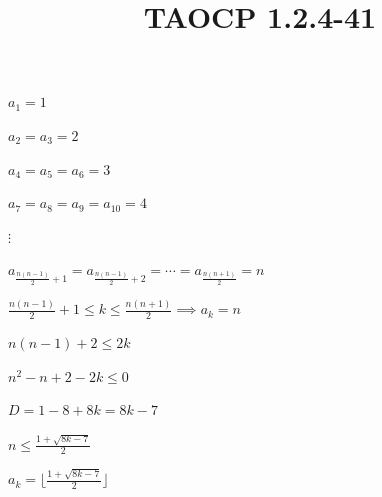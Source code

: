 \documentclass{article}
\title{TAOCP 1.2.4\mbox{-}41}
\begin{document}
\maketitle

\( a_{1} = 1 \)

\( a_{2} = a_{3} = 2 \)

\( a_{4} = a_{5} = a_{6} = 3 \)

\( a_{7} = a_{8} = a_{9} = a_{10} = 4 \)

\( \vdots \)

\( a_{\frac{n(n-1)}{2} + 1} = a_{\frac{n(n-1)}{2} + 2} = \cdots = a_{\frac{n(n+1)}{2}} = n \)

\( \frac{n(n-1)}{2} + 1 \leq k \leq \frac{n(n+1)}{2} \implies a_{k} = n \)

\( n(n-1)  +2 \leq 2k \)

\( n^{2}-n + 2-2k \leq 0 \)

\( D = 1 - 8 + 8k = 8k - 7 \)

\( n \leq \frac{1 + \sqrt{8k-7}}{2} \)

\( a_{k} = \lfloor \frac{1 + \sqrt{8k-7}}{2} \rfloor \)
\end{document}
